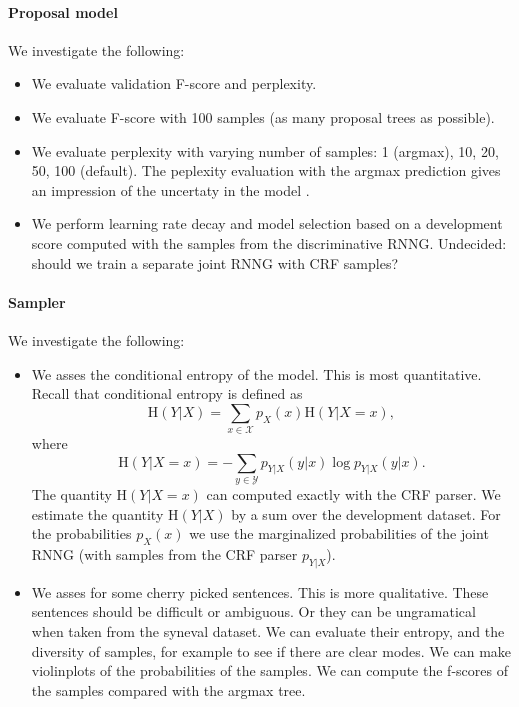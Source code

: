 \paragraph{Proposal model} We investigate the following:
\begin{itemize}
  \item We evaluate validation F-score and perplexity.
  \item We evaluate F-score with 100 samples (as many proposal trees as possible).
  \item We evaluate perplexity with varying number of samples: 1 (argmax), 10, 20, 50, 100 (default). The peplexity evaluation with the argmax prediction gives an impression of the uncertaty in the model \citep{buys2018exact}.
  \item  We perform learning rate decay and model selection based on a development score computed with the samples from the discriminative RNNG. Undecided: should we train a separate joint RNNG with CRF samples?
\end{itemize}

\paragraph{Sampler} We investigate the following:
\begin{itemize}
  \item We asses the conditional entropy of the model. This is most quantitative. Recall that conditional entropy is defined as
  \begin{equation}
    \text{H}(Y|X) = \sum_{x \in \mathcal{X}} p_X(x)\text{H}(Y|X = x),
  \end{equation}
  where
  \begin{equation}
    \text{H}(Y|X = x) = - \sum_{y \in \mathcal{Y}} p_{Y|X}(y|x) \log p_{Y|X}(y|x).
  \end{equation}
  The quantity $\text{H}(Y|X = x)$ can computed exactly with the CRF parser. We estimate the quantity $\text{H}(Y|X)$ by a sum over the development dataset. For the probabilities $p_X(x)$ we use the marginalized probabilities of the joint RNNG (with samples from the CRF parser $p_{Y|X}$).
  \item We asses for some cherry picked sentences. This is more qualitative. These sentences should be difficult or ambiguous. Or they can be ungramatical when taken from the syneval dataset. We can evaluate their entropy, and the diversity of samples, for example to see if there are clear modes. We can make violinplots of the probabilities of the samples. We can compute the f-scores of the samples compared with the argmax tree.
\end{itemize}

